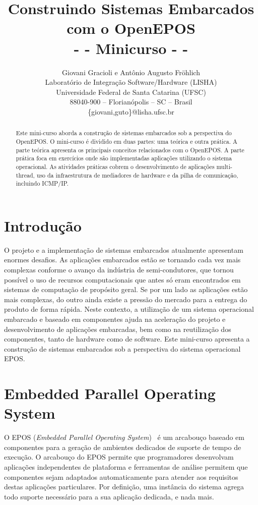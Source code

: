 \documentclass[11pt,twocolumn]{article}
\title{Construindo Sistemas Embarcados com o OpenEPOS\\
\normalsize{- - Minicurso - -}}
\author{Giovani Gracioli e Antônio Augusto Fröhlich\\
Laboratório de Integração Software/Hardware (LISHA)\\
Universidade Federal de Santa Catarina (UFSC)\\
88040-900 -- Florianópolis -- SC -- Brasil\\
\{giovani,guto\}@lisha.ufsc.br
}
\begin{document}
\maketitle
     
\begin{abstract}
Este mini-curso aborda a construção de sistemas embarcados sob a perspectiva do OpenEPOS. O mini-curso é dividido em duas partes: uma teórica e outra prática. A parte teórica apresenta os principais conceitos relacionados com o OpenEPOS. A parte prática foca em exercícios onde são implementadas aplicações utilizando o sistema operacional. As atividades práticas cobrem o desenvolvimento de aplicações multi-thread, uso da infraestrutura de mediadores de hardware e da pilha de comunicação, incluindo ICMP/IP.
\end{abstract}

\section{Introdução}

O projeto e a implementação de sistemas embarcados atualmente apresentam enormes desafios. As aplicações embarcados estão se tornando cada vez mais complexas conforme o avanço da indústria de semi-condutores, que tornou possível o uso de recursos computacionais que antes só eram encontrados em sistemas de computação de propósito geral. Se por um lado as aplicações estão mais complexas, do outro ainda existe a pressão do mercado para a entrega do produto de forma rápida. Neste contexto, a utilização de um sistema operacional embarcado e baseado em componentes ajuda na aceleração do projeto e desenvolvimento de aplicações embarcadas, bem como na reutilização dos componentes, tanto de hardware como de software. Este mini-curso apresenta a construção de sistemas embarcados sob a perspectiva do sistema operacional \textsc{EPOS}.

\section{Embedded Parallel Operating System}

O \textsc{EPOS} (\textit{Embedded Parallel Operating System})~\cite{Froehlich:2001,Marcondes:2006} é um arcabouço baseado em componentes para a geração de ambientes dedicados de suporte de tempo de execução. O arcabouço do \textsc{EPOS} permite que programadores desenvolvam aplicações independentes de plataforma e ferramentas de análise permitem que componentes sejam adaptados automaticamente para atender aos requisitos destas aplicações particulares. Por definição, uma instância do sistema agrega todo suporte necessário para a sua aplicação dedicada, e nada mais.
\end{document}
